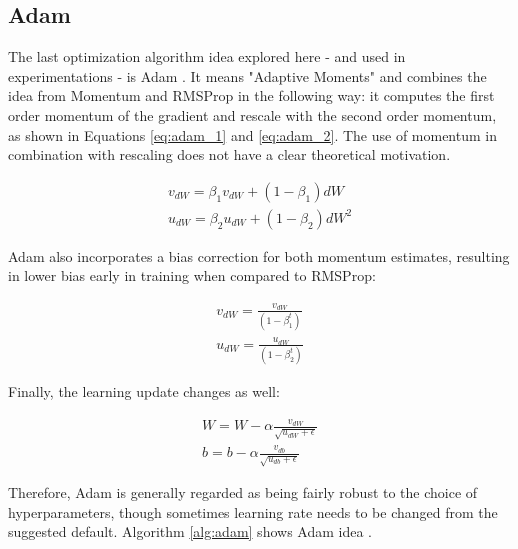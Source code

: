 \subsection{Adam}

The last optimization algorithm idea explored here - and used in experimentations - is Adam \cite{adam2014}. It means "Adaptive Moments" and combines the idea from Momentum and RMSProp in the following way: it computes the first order momentum of the gradient and rescale with the second order momentum, as shown in Equations \ref{eq:adam_1} and \ref{eq:adam_2}. The use of momentum in combination with rescaling does not have a clear theoretical motivation. 

\begin{align}\label{eq:adam_1}
v_{dW} = \beta_{1} v_{dW} + (1 - \beta_{1})dW\\
u_{dW} = \beta_{2} u_{dW} + (1 - \beta_{2})dW^2
\label{eq:adam_2}
\end{align}

Adam also incorporates a bias correction for both momentum estimates, resulting in lower bias early in training when compared to RMSProp:

\begin{align}
v_{dW} = \frac{v_{dW}}{(1 - \beta_{1}^{t})}\\
u_{dW} = \frac{u_{dW}}{(1 - \beta_{2}^{t})}
\end{align}

Finally, the learning update changes as well:

\begin{align}
W = W - \alpha  \frac{v_{dW}}{\sqrt{u_{dW} + \epsilon}} \\
b = b - \alpha \frac{v_{db}}{\sqrt{u_{db} + \epsilon}}
\end{align}

Therefore, Adam is generally regarded as being fairly robust to the choice of hyperparameters, though sometimes learning rate needs to be changed from the suggested default.  Algorithm \ref{alg:adam} shows Adam idea \cite{Goodfellow-et-al-2016}.


